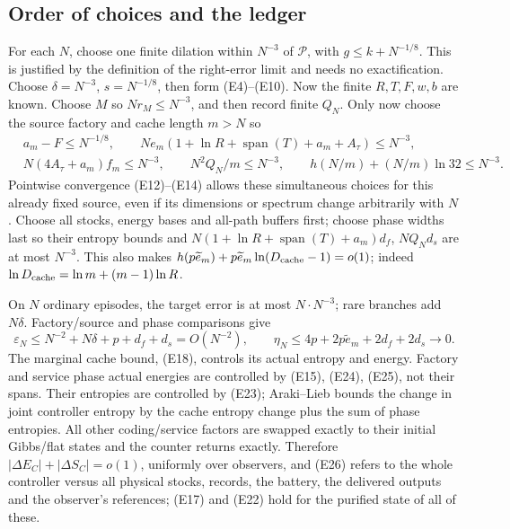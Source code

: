 \documentclass[11pt]{article}
\theoremstyle{definition}
\theoremstyle{remark}
\begin{document}
\subsection{Order of choices and the ledger}
For each \(N\), choose one finite dilation within \(N^{-3}\) of
\(\mathcal P\), with \(g\le k+N^{-1/8}\). This is justified by the
definition of the right-error limit and needs no exactification.
Choose \(\delta=N^{-3}\), \(s=N^{-1/8}\), then form (E4)--(E10).
Now the finite \(R,T,F,w,b\) are known. Choose \(M\) so
\(Nr_M\le N^{-3}\), and then record finite \(Q_N\).
Only now choose the source factory and cache length \(m>N\) so
\[
 \begin{split}
 &a_m-F\le N^{-1/8},\qquad
 N e_m(1+\ln R+\operatorname{span}(T)+a_m+A_\tau)\le N^{-3},\\
 &N(4A_\tau+a_m) f_m\le N^{-3},\qquad
 N^2Q_N/m\le N^{-3},\qquad h(N/m)+(N/m)\ln32\le N^{-3}.
 \end{split}                                                   \tag{E25}
\]
Pointwise convergence (E12)--(E14) allows these simultaneous choices
for this already fixed source, even if its dimensions or spectrum
change arbitrarily with \(N\).
Choose all stocks, energy bases and all-path buffers first; choose
phase widths last so their entropy bounds and
\(N(1+\ln R+\operatorname{span}(T)+a_m)d_f\), \(NQ_Nd_s\)
are at most \(N^{-3}\). This also makes
\(h(p\widetilde e_m)+p\widetilde e_m\ln(D_{\rm cache}-1)=o(1)\);
indeed \(\ln D_{\rm cache}=\ln m+(m-1)\ln R\).

On \(N\) ordinary episodes, the target error is at most
\(N\cdot N^{-3}\); rare branches add \(N\delta\). Factory/source and
phase comparisons give
\[
\varepsilon_N\le N^{-2}+N\delta+p+d_f+d_s=O(N^{-2}),\qquad
\eta_N\le4p+2p\widetilde e_m+2d_f+2d_s\to0.         \tag{E26}
\]
The marginal cache bound, (E18), controls its actual entropy and
energy. Factory and service phase actual energies are controlled by
(E15), (E24), (E25), not their spans. Their entropies are controlled by
(E23); Araki--Lieb bounds the change in joint controller entropy by
the cache entropy change plus the sum of phase entropies.
All other coding/service factors are swapped exactly to their initial
Gibbs/flat states and the counter returns exactly. Therefore
\(|\Delta E_C|+|\Delta S_C|=o(1)\), uniformly over observers, and
(E26) refers to the whole controller versus all physical stocks, records, the battery, the delivered outputs and the observer's references; (E17) and (E22) hold for the purified state of all of these.
\end{document}

